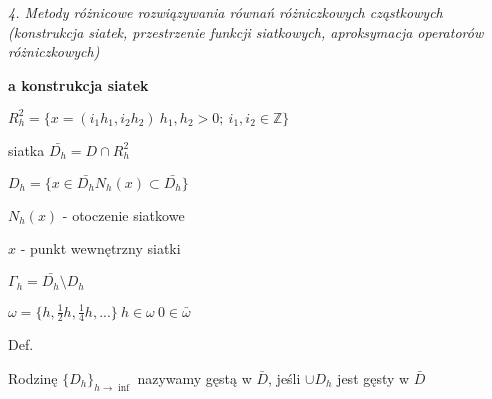 \textit{4. Metody różnicowe rozwiązywania równań różniczkowych cząstkowych (konstrukcja siatek, przestrzenie funkcji siatkowych, aproksymacja operatorów różniczkowych)}

\textbf{a\) konstrukcja siatek}

$R^{2}_{h} = \{ x = (i_{1}h_{1}, i_{2}h_{2})\ h_{1},h_{2} > 0;\ i_{1},i_{2} \in \mathbb{Z}\}$

siatka $\bar{D_{h}} = D \cap R^{2}_{h}$

$D_{h} = \{ x \in \bar{D_{h}} N_h(x) \subset \bar{D_{h}}\}$

$N_h(x)$ - otoczenie siatkowe

$x$ - punkt wewnętrzny siatki

$\Gamma_h = \bar{D_h} \setminus D_h$

$\omega = \{h, \frac{1}{2}h, \frac{1}{4}h, ...\}\ h \in \omega\ 0 \in \bar{\omega}$

Def.

Rodzinę $\{D_h\}_{h \rightarrow \inf}$ nazywamy gęstą w $\bar{D}$, jeśli $\cup D_h$ jest gęsty w $\bar{D}$